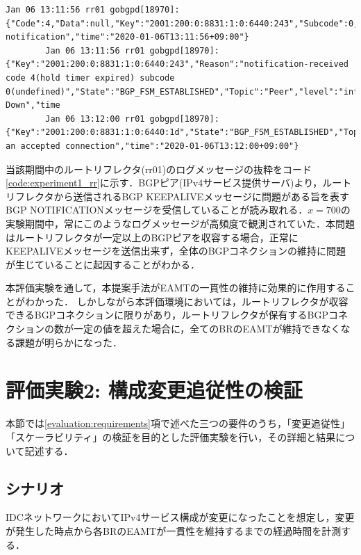 \begin{minipage}{\textwidth}
    \begin{lstlisting}[caption=EAMTが収束しない時点のルートリフレクタのログの抜粋,label=code:experiment1_rr]
        Jan 06 13:11:56 rr01 gobgpd[18970]: {"Code":4,"Data":null,"Key":"2001:200:0:8831:1:0:6440:243","Subcode":0,"Topic":"Peer","level":"warning","msg":"received notification","time":"2020-01-06T13:11:56+09:00"}
        Jan 06 13:11:56 rr01 gobgpd[18970]: {"Key":"2001:200:0:8831:1:0:6440:243","Reason":"notification-received code 4(hold timer expired) subcode 0(undefined)","State":"BGP_FSM_ESTABLISHED","Topic":"Peer","level":"info","msg":"Peer Down","time
        Jan 06 13:12:00 rr01 gobgpd[18970]: {"Key":"2001:200:0:8831:1:0:6440:1d","State":"BGP_FSM_ESTABLISHED","Topic":"Peer","level":"warning","msg":"Closed an accepted connection","time":"2020-01-06T13:12:00+09:00"}
    \end{lstlisting}
\end{minipage}
    
    
当該期間中のルートリフレクタ(rr01)のログメッセージの抜粋をコード\ref{code:experiment1_rr}に示す．BGPピア(IPv4サービス提供サーバ)より，ルートリフレクタから送信されるBGP KEEPALIVEメッセージに問題がある旨を表すBGP NOTIFICATIONメッセージを受信していることが読み取れる．$x=700$の実験期間中，常にこのようなログメッセージが高頻度で観測されていた．本問題はルートリフレクタが一定以上のBGPピアを収容する場合，正常にKEEPALIVEメッセージを送信出来ず，全体のBGPコネクションの維持に問題が生じていることに起因することがわかる．


本評価実験を通して，本提案手法がEAMTの一貫性の維持に効果的に作用することがわかった．
しかしながら本評価環境においては，ルートリフレクタが収容できるBGPコネクションに限りがあり，ルートリフレクタが保有するBGPコネクションの数が一定の値を超えた場合に，全てのBRのEAMTが維持できなくなる課題が明らかになった．




\section{評価実験2: 構成変更追従性の検証}
\label{evaluation:eval2}
本節では\ref{evaluation:requirements}項で述べた三つの要件のうち，「変更追従性」「スケーラビリティ」の検証を目的とした評価実験を行い，その詳細と結果について記述する．



\subsection{シナリオ}
IDCネットワークにおいてIPv4サービス構成が変更になったことを想定し，変更が発生した時点から各BRのEAMTが一貫性を維持するまでの経過時間を計測する．

